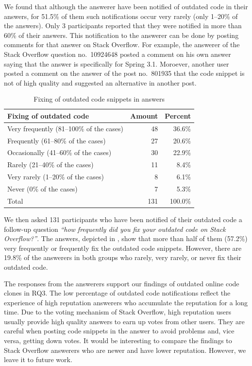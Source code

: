 \documentclass[10pt,journal,compsoc]{IEEEtran}
\begin{document}
We found that although the answerer have been notified of outdated code in their
answers, for 51.5\% of them such notifications occur very rarely (only 1--20\%
of the answers). Only 3 participants reported that they were notified in more
than 60\% of their answers. This notification to the answerer can be done by
posting comments for that answer on Stack Overflow. For example, the answerer of
the Stack Overflow question no.~10924648 posted a comment on his own answer
saying that the answer is specifically for Spring 3.1. Moroever, another user
posted a comment on the answer of the post no.~801935 that the code snippet is
not of high quality and suggested an alternative in another post.

\begin{table}
	\centering
	\caption{Fixing of outdated code snippets in answers}
	\label{tab:survey_code_snippet_outdated_fix}
	\begin{tabular}{lrr}
		\toprule
		Fixing of outdated code & Amount & Percent \\
		\midrule
		Very frequently (81--100\% of the cases) & 48 & 36.6\% \\
		Frequently (61--80\% of the cases) & 27 & 20.6\% \\
		Occasionally (41--60\% of the cases) & 30 & 22.9\% \\
		Rarely (21--40\% of the cases) & 11 & 8.4\% \\
		Very rarely (1--20\% of the cases) & 8 & 6.1\% \\
		Never (0\% of the cases) & 7 & 5.3\% \\
		\midrule
		Total & 131 & 100.0\% \\
		\bottomrule
	\end{tabular}
\end{table}

We then asked 131 participants who have been notified of their outdated code a
follow-up question \textit{``how frequently did you fix your outdated code on Stack
	Overflow?''}. The answers, depicted in
, show that more than half of them
(57.2\%) very frequently or frequently fix the outdated code snippets. However,
there are 19.8\% of the answerers in both groups who rarely, very rarely, or never fix 
their outdated code.

The responses from the answerers support our findings of outdated online code
clones in RQ3. The low percentage of outdated code notifications
reflect the experience of high reputation answerers who accumulate the reputation for a
long time. Due to the voting mechanism of Stack Overflow, high reputation users
usually provide high quality answers to earn up votes from other users. They are
careful when posting code snippets in the answer to avoid problems and, vice versa, 
getting down votes. It would be interesting to compare the findings to
Stack Overflow answerers who are newer and have lower reputation. However, we
leave it to future work.
\end{document}
